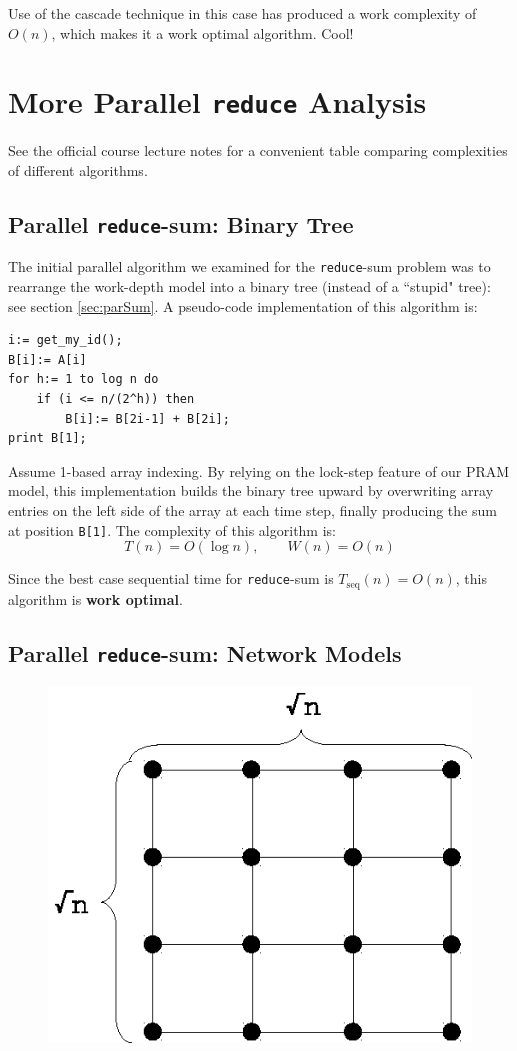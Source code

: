 \documentclass[twoside]{article}
\begin{document}
Use of the cascade technique in this case has produced a work complexity of $O(n)$, which makes it a work optimal algorithm. Cool!

\pagebreak
\section{More Parallel \texttt{reduce} Analysis}

See the official course lecture notes for a convenient table comparing complexities of different algorithms.

\subsection{Parallel \texttt{reduce}-sum: Binary Tree}
The initial parallel algorithm we examined for the \texttt{reduce}-sum problem was to rearrange the work-depth model into a binary tree (instead of a ``stupid" tree): see section \ref{sec:parSum}. A pseudo-code implementation of this algorithm is:
\begin{lstlisting}
i:= get_my_id();
B[i]:= A[i]
for h:= 1 to log n do
	if (i <= n/(2^h)) then
		B[i]:= B[2i-1] + B[2i];
print B[1];
\end{lstlisting}

Assume 1-based array indexing. By relying on the lock-step feature of our PRAM model, this implementation builds the binary tree upward by overwriting array entries on the left side of the array at each time step, finally producing the sum at position \texttt{B[1]}. The complexity of this algorithm is:
\[
T(n) = O(\log n),\qquad W(n) = O(n)
\]

Since the best case sequential time for \texttt{reduce}-sum is $T_{\text{seq}}(n) = O(n)$, this algorithm is \textbf{work optimal}.

\subsection{Parallel \texttt{reduce}-sum: Network Models}
\begin{figure}
\includegraphics[scale=0.75]{img/mesh.eps}
\end{figure}
\end{document}
